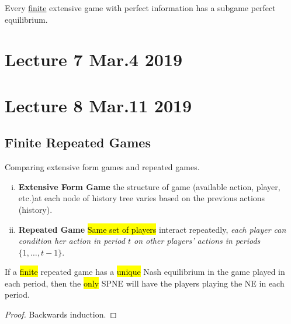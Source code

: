 \documentclass[11pt]{article}
\begin{document}
			\begin{theorem}
				Every \ul{finite} extensive game with perfect information has a subgame perfect equilibrium.
			\end{theorem}
		\section{Lecture 7 Mar.4 2019}
		
		\section{Lecture 8 Mar.11 2019}
			\subsection{Finite Repeated Games}
				\begin{remark}Comparing extensive form games and repeated games.
					\begin{enumerate}[(i)]
						\item \textbf{Extensive Form Game} the structure of game (available action, player, etc.)at each node of history tree varies based on the previous actions (history).
						\item \textbf{Repeated Game} \hl{Same set of players} interact repeatedly, \emph{each player can condition her action in period $t$ on other players' actions in periods $\{1,\dots,t-1\}$}.
					\end{enumerate}
				\end{remark}
				
				\begin{theorem}
					If a \hl{finite} repeated game has a \hl{unique} Nash equilibrium in the game played in each period, then the \hl{only} SPNE will have the players playing the NE in each period.
					\begin{proof}
						Backwards induction.
					\end{proof}
				\end{theorem}
			
\end{document}
